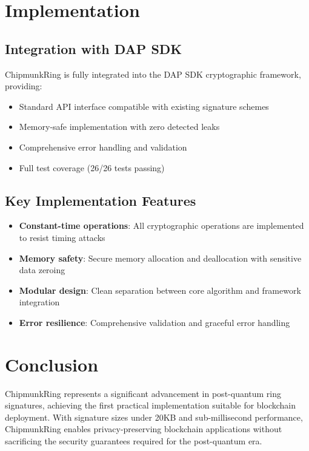 \documentclass[11pt,a4paper]{article}
\begin{document}
\section{Implementation}

\subsection{Integration with DAP SDK}

ChipmunkRing is fully integrated into the DAP SDK cryptographic framework, providing:

\begin{itemize}
\item Standard API interface compatible with existing signature schemes
\item Memory-safe implementation with zero detected leaks
\item Comprehensive error handling and validation
\item Full test coverage (26/26 tests passing)
\end{itemize}

\subsection{Key Implementation Features}

\begin{itemize}
\item \textbf{Constant-time operations}: All cryptographic operations are implemented to resist timing attacks
\item \textbf{Memory safety}: Secure memory allocation and deallocation with sensitive data zeroing
\item \textbf{Modular design}: Clean separation between core algorithm and framework integration
\item \textbf{Error resilience}: Comprehensive validation and graceful error handling
\end{itemize}

\section{Conclusion}

ChipmunkRing represents a significant advancement in post-quantum ring signatures, achieving the first practical implementation suitable for blockchain deployment. With signature sizes under 20KB and sub-millisecond performance, ChipmunkRing enables privacy-preserving blockchain applications without sacrificing the security guarantees required for the post-quantum era.
\end{document}
